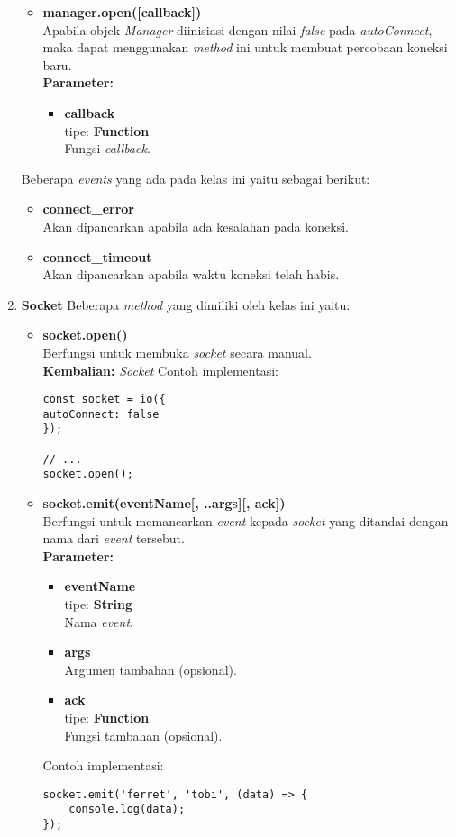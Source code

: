 \begin{enumerate}
\begin{itemize}
		\item \textbf{manager.open([callback])} \\
		Apabila objek \textit{Manager} diinisiasi dengan nilai \textit{false} pada \textit{autoConnect}, maka dapat menggunakan \textit{method} ini untuk membuat percobaan koneksi baru.\\
		\textbf{Parameter:}
		\begin{itemize}
			\item \textbf{callback} \\tipe: \textbf{Function} \\ Fungsi \textit{callback}.
		\end{itemize}
	\end{itemize}

	Beberapa \textit{events} yang ada pada kelas ini yaitu sebagai berikut:
	\begin{itemize}
		\item \textbf{connect\_error} \\ Akan dipancarkan apabila ada kesalahan pada koneksi.
		\item \textbf{connect\_timeout} \\ Akan dipancarkan apabila waktu koneksi telah habis.
	\end{itemize}
	
	\item \textbf{Socket}
	Beberapa \textit{method} yang dimiliki oleh kelas ini yaitu:
	\begin{itemize}
		\item \textbf{socket.open()} \\ Berfungsi untuk membuka \textit{socket} secara manual.\\
		\textbf{Kembalian:} \textit{Socket}
		Contoh implementasi:
\begin{lstlisting}
const socket = io({
autoConnect: false
});
	
// ...
socket.open();
\end{lstlisting}
	
	\item \textbf{socket.emit(eventName[, ..args][, ack])} \\ 
	Berfungsi untuk memancarkan \textit{event} kepada \textit{socket} yang ditandai dengan nama dari \textit{event} tersebut.\\ 
	\textbf{Parameter:}
	\begin{itemize}
		\item \textbf{eventName} \\tipe: \textbf{String} \\ Nama \textit{event}.
		\item \textbf{args} \\ Argumen tambahan (opsional).
		\item \textbf{ack} \\tipe: \textbf{Function} \\ Fungsi tambahan (opsional).
	\end{itemize}
	Contoh implementasi:
\begin{lstlisting}
socket.emit('ferret', 'tobi', (data) => {
	console.log(data);
});
\end{lstlisting}
	

\end{itemize}
\end{enumerate}
